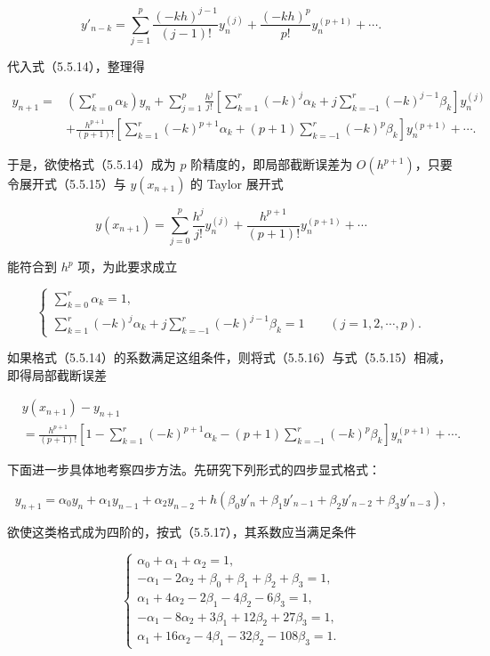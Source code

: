 \documentclass[
  10pt,
  fontset=fandol]{ctexart}
\begin{document}
\[
y'_{n-k}=\sum_{j=1}^p\frac{(-kh)^{j-1}}{(j-1)!}y_n^{(j)}+\frac{(-kh)^p}{p!}y_n^{(p+1)}+\cdots.
\]

代入式（5.5.14），整理得

\[
\begin{aligned}
y_{n+1}={}&\left(\sum_{k=0}^r\alpha_k\right)y_n+\sum_{j=1}^p\frac{h^j}{j!}\left[\sum_{k=1}^r(-k)^j\alpha_k+j\sum_{k=-1}^r(-k)^{j-1}\beta_k\right]y_n^{(j)}\\
&+\frac{h^{p+1}}{(p+1)!}\left[\sum_{k=1}^r(-k)^{p+1}\alpha_k+(p+1)\sum_{k=-1}^r(-k)^p\beta_k\right]y_n^{(p+1)}+\cdots.
\end{aligned}
\tag{5.5.15}
\]

于是，欲使格式（5.5.14）成为 \(p\) 阶精度的，即局部截断误差为 \(O(h^{p+1})\)，只要令展开式（5.5.15）与 \(y(x_{n+1})\) 的 Taylor 展开式

\[
y(x_{n+1})=\sum_{j=0}^p\frac{h^j}{j!}y_n^{(j)}+\frac{h^{p+1}}{(p+1)!}y_n^{(p+1)}+\cdots
\tag{5.5.16}
\]

能符合到 \(h^p\) 项，为此要求成立

\[
\begin{cases}
\displaystyle\sum_{k=0}^r\alpha_k=1,\\[6pt]
\displaystyle\sum_{k=1}^r(-k)^j\alpha_k+j\sum_{k=-1}^r(-k)^{j-1}\beta_k=1\qquad(j=1,2,\cdots,p).
\end{cases}
\tag{5.5.17}
\]

如果格式（5.5.14）的系数满足这组条件，则将式（5.5.16）与式（5.5.15）相减，即得局部截断误差

\[
\begin{aligned}
&y(x_{n+1})-y_{n+1}\\
&=\frac{h^{p+1}}{(p+1)!}\left[1-\sum_{k=1}^r(-k)^{p+1}\alpha_k-(p+1)\sum_{k=-1}^r(-k)^p\beta_k\right]y_n^{(p+1)}+\cdots.
\end{aligned}
\tag{5.5.18}
\]

下面进一步具体地考察四步方法。先研究下列形式的四步显式格式：

\[
y_{n+1}=\alpha_0y_n+\alpha_1y_{n-1}+\alpha_2y_{n-2}+h(\beta_0y'_n+\beta_1y'_{n-1}+\beta_2y'_{n-2}+\beta_3y'_{n-3}),
\tag{5.5.19}
\]

欲使这类格式成为四阶的，按式（5.5.17），其系数应当满足条件

\[
\begin{cases}
\alpha_0+\alpha_1+\alpha_2=1,\\
-\alpha_1-2\alpha_2+\beta_0+\beta_1+\beta_2+\beta_3=1,\\
\alpha_1+4\alpha_2-2\beta_1-4\beta_2-6\beta_3=1,\\
-\alpha_1-8\alpha_2+3\beta_1+12\beta_2+27\beta_3=1,\\
\alpha_1+16\alpha_2-4\beta_1-32\beta_2-108\beta_3=1.
\end{cases}
\tag{5.5.20}
\]
\end{document}
